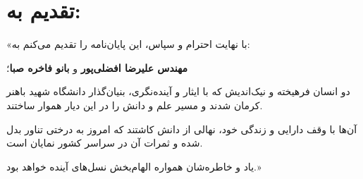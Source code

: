 \chapter*{\vspace{-2.38cm}\fontsize{15}{16}\selectfont تقدیم به:}

«با نهایت احترام و سپاس، این پایان‌نامه را تقدیم می‌کنم به:

\textbf{مهندس علیرضا افضلی‌پور} و \textbf{بانو فاخره صبا}؛

دو انسان فرهیخته و نیک‌اندیش که با ایثار و آینده‌نگری، بنیان‌گذار دانشگاه شهید باهنر کرمان شدند و مسیر علم و دانش را در این دیار هموار ساختند.

آن‌ها با وقف دارایی و زندگی خود، نهالی از دانش کاشتند که امروز به درختی تناور بدل شده و ثمرات آن در سراسر کشور نمایان است.

یاد و خاطره‌شان همواره الهام‌بخش نسل‌های آینده خواهد بود.»
